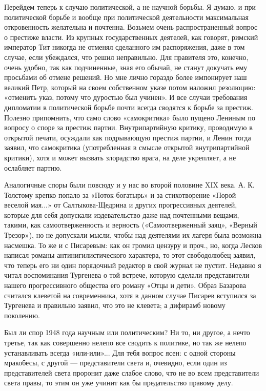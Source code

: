 Перейдем теперь к случаю политической, а не научной борьбы. Я думаю, и
при политической борьбе и вообще при политической деятельности
максимальная откровенность желательна и почтенна. Возьмем очень
распространенный вопрос о престиже власти. Из крупных государственных
деятелей, как говорят, римский император Тит никогда не отменял
сделанного им распоряжения, даже в том случае, если убеждался, что
решил неправильно. Для правителя это, конечно, очень удобно, так как
подчиненные, зная его обычай, не станут докучать ему просьбами об
отмене решений. Но мне лично гораздо более импонирует наш великий
Петр, который на своем собственном указе потом наложил резолюцию:
«отменить указ, потому что дуростью был учинен». И все случаи
требования дипломатии в политической борьбе почти всегда сводятся к
борьбе за престиж. Полезно припомнить, что само слово «самокритика»
было пущено Лениным по вопросу о споре за престиж партии.
Внутрипартийную критику, проводимую в открытой печати, осуждали как
подрывающую престиж партии, и Ленин тогда заявил, что самокритика
(употребленная в смысле открытой внутрипартийной критики), хотя и
может вызвать злорадство врага, на деле укрепляет, а не ослабляет
партию.

Аналогичные споры были повсюду и у нас во второй половине XIX века. А.
К. Толстому крепко попало за «Поток-богатырь» и за стихотворение
«Порой веселой мая...» от Салтыкова-Щедрина и других прогрессивных
деятелей, которые для себя допускали издевательство даже над
почтенными вещами, такими, как самоотверженность и верность
(«Самоотверженный заяц», «Верный Трезор»), но не допускали мысли,
чтобы над деятелями их лагеря была возможна насмешка. То же и с
Писаревым: как он громил цензуру и проч., но, когда Лесков написал
романы антинигилистического характера, то этот свободолюбец заявил,
что теперь его ни один порядочный редактор в свой журнал не пустит.
Недавно я читал воспоминания Тургенева о той встрече, которую сделали
представители нашего прогрессивного общества его роману «Отцы и дети».
Образ Базарова считался клеветой на современника, хотя в данном случае
Писарев вступился за Тургенева и правильно заявил, что это не клевета;
а дифирамб новому поколению.

Был ли спор 1948 года научным или политическим? Ни то, ни другое, а
нечто третье, так как совершенно нелепо все сводить к политике, но так
же нелепо устанавливать всегда «или-или»... Для тебя вопрос ясен: с
одной стороны мракобесы, с другой --- представители света и, очевидно,
если один из представителей света проронит даже слабое слово, что не
во всем представители света правы, то этим он уже учинит как бы
предательство правому делу.

